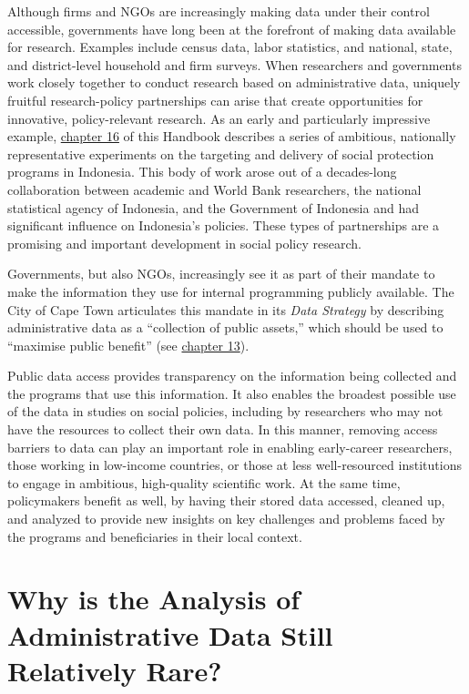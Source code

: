 \documentclass[
]{book}
\begin{document}
Although firms and NGOs are increasingly making data under their control accessible, governments have long been at the forefront of making data available for research. Examples include census data, labor statistics, and national, state, and district-level household and firm surveys. When researchers and governments work closely together to conduct research based on administrative data, uniquely fruitful research-policy partnerships can arise that create opportunities for innovative, policy-relevant research. As an early and particularly impressive example, \protect\hyperlink{indonesia}{chapter 16} of this Handbook describes a series of ambitious, nationally representative experiments on the targeting and delivery of social protection programs in Indonesia. This body of work arose out of a decades-long collaboration between academic and World Bank researchers, the national statistical agency of Indonesia, and the Government of Indonesia and had significant influence on Indonesia's policies. These types of partnerships are a promising and important development in social policy research.

Governments, but also NGOs, increasingly see it as part of their mandate to make the information they use for internal programming publicly available. The City of Cape Town articulates this mandate in its \emph{Data Strategy} by describing administrative data as a ``collection of public assets,'' which should be used to ``maximise public benefit'' (see \protect\hyperlink{cct}{chapter 13}).

Public data access provides transparency on the information being collected and the programs that use this information. It also enables the broadest possible use of the data in studies on social policies, including by researchers who may not have the resources to collect their own data. In this manner, removing access barriers to data can play an important role in enabling early-career researchers, those working in low-income countries, or those at less well-resourced institutions to engage in ambitious, high-quality scientific work. At the same time, policymakers benefit as well, by having their stored data accessed, cleaned up, and analyzed to provide new insights on key challenges and problems faced by the programs and beneficiaries in their local context.

\hypertarget{why-is-the-analysis-of-administrative-data-still-relatively-rare}{%
\section{Why is the Analysis of Administrative Data Still Relatively Rare?}\label{why-is-the-analysis-of-administrative-data-still-relatively-rare}}
\end{document}
